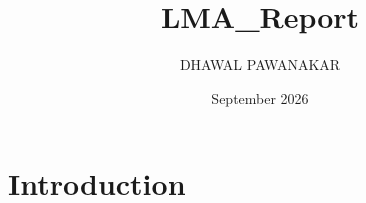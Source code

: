 \documentclass{article}
\title{LMA_Report}
\author{DHAWAL PAWANAKAR}
\date{September 2026}
\begin{document}
\maketitle

\section{Introduction}
\end{document}
